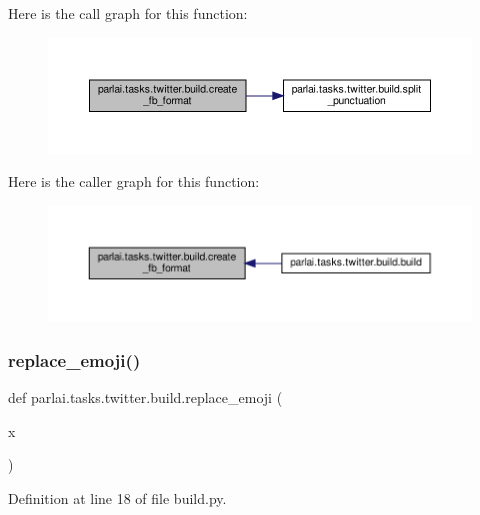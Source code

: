 Here is the call graph for this function\+:
\nopagebreak
\begin{figure}[H]
\begin{center}
\leavevmode
\includegraphics[width=350pt]{namespaceparlai_1_1tasks_1_1twitter_1_1build_ab36b25b09bea28cdf3278f910e5e9ff6_cgraph}
\end{center}
\end{figure}
Here is the caller graph for this function\+:
\nopagebreak
\begin{figure}[H]
\begin{center}
\leavevmode
\includegraphics[width=350pt]{namespaceparlai_1_1tasks_1_1twitter_1_1build_ab36b25b09bea28cdf3278f910e5e9ff6_icgraph}
\end{center}
\end{figure}
\mbox{\label{namespaceparlai_1_1tasks_1_1twitter_1_1build_aea2acf2542f3fb1294fa121bb7cb1a76}} 
\subsubsection{\texorpdfstring{replace\+\_\+emoji()}{replace\_emoji()}}
{\footnotesize\ttfamily def parlai.\+tasks.\+twitter.\+build.\+replace\+\_\+emoji (\begin{DoxyParamCaption}\item[{}]{x }\end{DoxyParamCaption})}



Definition at line 18 of file build.\+py.

